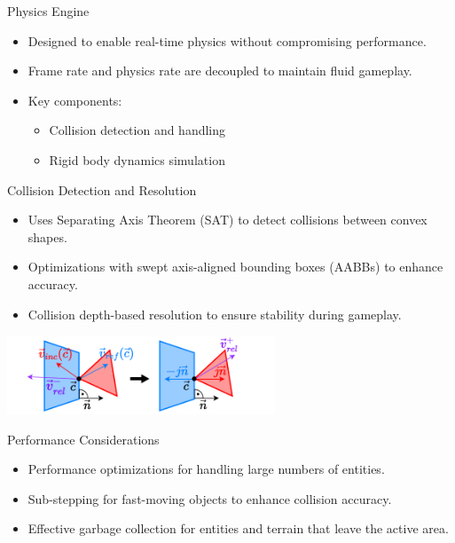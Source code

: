 
\begin{frame}{Physics Engine}
    \begin{itemize}
        \item Designed to enable real-time physics without compromising performance.
        \item Frame rate and physics rate are decoupled to maintain fluid gameplay.
        \item Key components:
        \begin{itemize}
            \item Collision detection and handling
            \item Rigid body dynamics simulation
        \end{itemize}
    \end{itemize}
\end{frame}

\begin{frame}{Collision Detection and Resolution}
    \begin{itemize}
        \item Uses Separating Axis Theorem (SAT) to detect collisions between convex shapes.
        \item Optimizations with swept axis-aligned bounding boxes (AABBs) to enhance accuracy.
        \item Collision depth-based resolution to ensure stability during gameplay.
    \end{itemize}
    \centering
    \includegraphics[width=0.6\textwidth]{../figures/physics/resolution.pdf} %
\end{frame}

\begin{frame}{Performance Considerations}
    \begin{itemize}
        \item Performance optimizations for handling large numbers of entities.
        \item Sub-stepping for fast-moving objects to enhance collision accuracy.
        \item Effective garbage collection for entities and terrain that leave the active area.
    \end{itemize}
\end{frame}